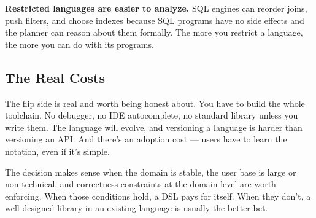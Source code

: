 \textbf{Restricted languages are easier to analyze.} SQL engines can reorder joins,
push filters, and choose indexes because SQL programs have no side effects and the planner
can reason about them formally. The more you restrict a language, the more you can do
with its programs.

\subsection{The Real Costs}

The flip side is real and worth being honest about. You have to build the whole toolchain.
No debugger, no IDE autocomplete, no standard library unless you write them. The language
will evolve, and versioning a language is harder than versioning an API. And there's an
adoption cost --- users have to learn the notation, even if it's simple.

The decision makes sense when the domain is stable, the user base is large or non-technical,
and correctness constraints at the domain level are worth enforcing. When those conditions
hold, a DSL pays for itself. When they don't, a well-designed library in an existing
language is usually the better bet.
